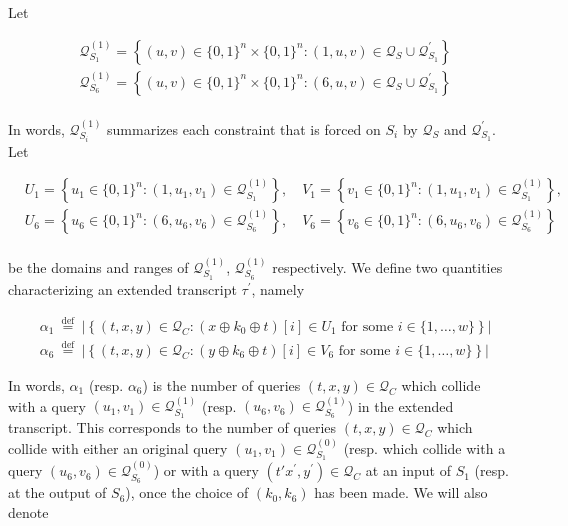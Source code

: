 \noindent Let

$$
\begin{aligned}
&\mathcal{Q}_{S_{1}}^{(1)}=\left\{(u, v) \in\{0,1\}^{n} \times\{0,1\}^{n}:(1, u, v) \in \mathcal{Q}_{S} \cup \mathcal{Q}_{S_{1}}^{\prime}\right\}\\
&\mathcal{Q}_{S_{6}}^{(1)}=\left\{(u, v) \in\{0,1\}^{n} \times\{0,1\}^{n}:(6, u, v) \in \mathcal{Q}_{S} \cup \mathcal{Q}_{S_{1}}^{\prime}\right\}\\
\end{aligned}
$$

\noindent In words, $\mathcal{Q}_{S_{i}}^{(1)}$ summarizes each constraint that is forced on $S_{i}$ by $\mathcal{Q}_{S}$ and $\mathcal{Q}_{S_{1}}^{\prime}$. Let

$$
\begin{aligned}
&U_{1}=\left\{u_{1} \in\{0,1\}^{n}:\left(1, u_{1}, v_{1}\right) \in \mathcal{Q}_{S_{1}}^{(1)}\right\}, \quad V_{1}=\left\{v_{1} \in\{0,1\}^{n}:\left(1, u_{1}, v_{1}\right) \in \mathcal{Q}_{S_{1}}^{(1)}\right\},\\
&U_{6}=\left\{u_{6} \in\{0,1\}^{n}:\left(6, u_{6}, v_{6}\right) \in \mathcal{Q}_{S_{6}}^{(1)}\right\}, \quad V_{6}=\left\{v_{6} \in\{0,1\}^{n}:\left(6, u_{6}, v_{6}\right) \in \mathcal{Q}_{S_{6}}^{(1)}\right\}\\
\end{aligned}
$$

\noindent be the domains and ranges of $\mathcal{Q}_{S_{1}}^{(1)}$, $\mathcal{Q}_{S_{6}}^{(1)}$ respectively. We define two quantities characterizing an extended transcript $\tau^{\prime}$, namely

$$
\begin{aligned}
&\alpha_{1} \stackrel{\text { def }}{=} |\left\{(t, x, y) \in \mathcal{Q}_{C}: \left(x \oplus k_{0} \oplus t\right)[i] \in U_{1} \text { for some } i \in\{1, \ldots, w\}\right\} |\\
&\alpha_{6} \stackrel{\text { def }}{=} |\left\{(t, x, y) \in \mathcal{Q}_{C}: \left(y \oplus k_{6} \oplus t\right)[i] \in V_{6} \text { for some } i \in\{1, \ldots, w\}\right\} |
\end{aligned}
$$

In words, $\alpha_1$ (resp. $\alpha_6$) is the number of queries $(t, x, y) \in \mathcal{Q}_{C}$ which collide with a query $\left(u_{1}, v_{1}\right) \in \mathcal{Q}_{S_{1}}^{(1)}$ (resp. $\left(u_{6}, v_{6}\right) \in \mathcal{Q}_{S_{6}}^{(1)}$) in the extended transcript. This corresponds to the number of queries $(t, x, y) \in \mathcal{Q}_{C}$ which collide with either an original query $\left(u_{1}, v_{1}\right) \in \mathcal{Q}_{S_{1}}^{(0)}$ (resp. which collide with a query $\left(u_{6}, v_{6}\right) \in \mathcal{Q}_{S_{6}}^{(0)}$) or with a query $\left(t' x^{\prime}, y^{\prime}\right) \in \mathcal{Q}_{C}$ at an input of $S_1$ (resp. at the output of $S_6$), once the choice of $\left(k_{0}, k_{6}\right)$  has been made. We will also denote

